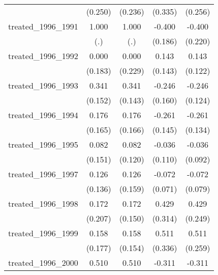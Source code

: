 {\begin{tabular}{l*{4}{c}}
            &     (0.250)         &     (0.236)         &     (0.335)         &     (0.256)         \\
[1em]
treated\_1996\_1991&       1.000         &       1.000         &      -0.400\sym{*}  &      -0.400         \\
            &         (.)         &         (.)         &     (0.186)         &     (0.220)         \\
[1em]
treated\_1996\_1992&       0.000         &       0.000         &       0.143         &       0.143         \\
            &     (0.183)         &     (0.229)         &     (0.143)         &     (0.122)         \\
[1em]
treated\_1996\_1993&       0.341\sym{*}  &       0.341\sym{*}  &      -0.246         &      -0.246\sym{*}  \\
            &     (0.152)         &     (0.143)         &     (0.160)         &     (0.124)         \\
[1em]
treated\_1996\_1994&       0.176         &       0.176         &      -0.261         &      -0.261         \\
            &     (0.165)         &     (0.166)         &     (0.145)         &     (0.134)         \\
[1em]
treated\_1996\_1995&       0.082         &       0.082         &      -0.036         &      -0.036         \\
            &     (0.151)         &     (0.120)         &     (0.110)         &     (0.092)         \\
[1em]
treated\_1996\_1997&       0.126         &       0.126         &      -0.072         &      -0.072         \\
            &     (0.136)         &     (0.159)         &     (0.071)         &     (0.079)         \\
[1em]
treated\_1996\_1998&       0.172         &       0.172         &       0.429         &       0.429         \\
            &     (0.207)         &     (0.150)         &     (0.314)         &     (0.249)         \\
[1em]
treated\_1996\_1999&       0.158         &       0.158         &       0.511         &       0.511\sym{*}  \\
            &     (0.177)         &     (0.154)         &     (0.336)         &     (0.259)         \\
[1em]
treated\_1996\_2000&       0.510\sym{**} &       0.510         &      -0.311         &      -0.311         \\

\end{tabular}}
